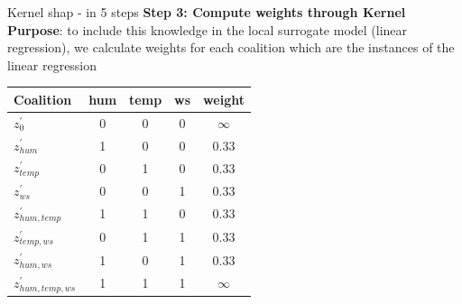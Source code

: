 \documentclass[11pt,compress,t,notes=noshow, aspectratio=169, xcolor=table]{beamer}
\begin{document}
\begin{vbframe}{Kernel shap - in 5 steps}
\textbf{Step 3: Compute weights through Kernel}\\\medskip
\textbf{Purpose}: to include this knowledge in the local surrogate model (linear regression), we calculate weights for each coalition which are the instances of the linear regression

\begin{table}[]
    \centering
        \begin{tabular}{l |ccc|c}
  Coalition &  hum & temp & ws & weight \\
  \hline 
  $z^{\prime}_{0}$ & 0 & 0 & 0 & $\infty$ \\
   $z^{\prime}_{hum}$ & 1 & 0 & 0 & 0.33 \\
    $z^{\prime}_{temp}$ & 0 & 1 & 0 & 0.33 \\
     $z^{\prime}_{ws}$ & 0 & 0 & 1 & 0.33 \\
     $z^{\prime}_{hum, temp}$ & 1 & 1 & 0 & 0.33 \\
     $z^{\prime}_{temp, ws}$ & 0 & 1 & 1 &0.33 \\
     $z^{\prime}_{hum, ws}$ & 1 & 0 & 1 & 0.33 \\
  $z^{\prime}_{hum, temp, ws}$ & 1 & 1 & 1 & $\infty$ \\
  
 
  \end{tabular}
\end{table}
\medskip
{}

  
\end{vbframe}

\end{document}
